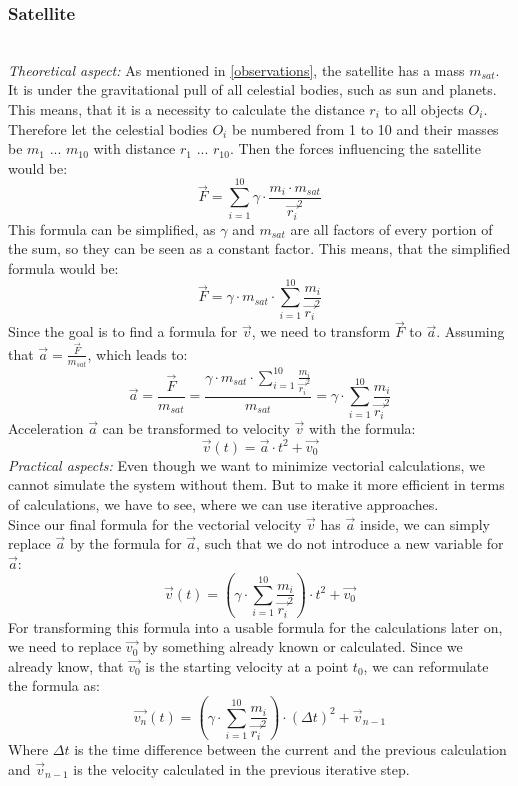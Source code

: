 \documentclass[conference,compsoc]{IEEEtran}
\begin{document}
\subsubsection{Satellite}\hfill\\
\label{satellite}
\emph{Theoretical aspect: } As mentioned in \ref{observations}, the satellite has a mass $m_{sat}$. It is under the gravitational pull of all celestial bodies, such as sun and planets. This means, that it is a necessity to calculate the distance $r_{i}$ to all objects $O_{i}$.
Therefore let the celestial bodies $O_{i}$ be numbered from 1 to 10 and their masses be $m_{1}$ ... $m_{10}$ with distance $r_{1}$ ... $r_{10}$. Then the forces influencing the satellite would be:
$$ \vec{F} = \sum_{i=1}^{10}{\gamma \cdot \frac{m_{i} \cdot m_{sat}}{\vec{r_{i}}^{2}}} $$
This formula can be simplified, as $\gamma$ and $m_{sat}$ are all factors of every portion of the sum, so they can be seen as a constant factor. This means, that the simplified formula would be:
$$ \vec{F} = \gamma \cdot m_{sat} \cdot \sum_{i=1}^{10}{\frac{m_{i}}{\vec{r_{i}}^{2}}} $$
Since the goal is to find a formula for $\vec{v}$, we need to transform $\vec{F}$ to $\vec{a}$. Assuming that $\vec{a} = \frac{\vec{F}}{m_{sat}}$, which leads to:
$$ \vec{a} = \frac{\vec{F}}{m_{sat}} = \frac{\gamma \cdot m_{sat} \cdot \sum_{i=1}^{10}{\frac{m_{i}}{\vec{r_{i}}^{2}}}}{m_{sat}} = \gamma \cdot \sum_{i=1}^{10}{\frac{m_{i}}{\vec{r_{i}}^{2}}} $$
Acceleration $\vec{a}$ can be transformed to velocity $\vec{v}$ with the formula: 
$$ \vec{v}(t) = \vec{a} \cdot t^{2} + \vec{v_{0}} $$
\emph{Practical aspects: } Even though we want to minimize vectorial calculations, we cannot simulate the system without them. But to make it more efficient in terms of calculations, we have to see, where we can use iterative approaches. \\ 
Since our final formula for the vectorial velocity $\vec{v}$ has $\vec{a}$ inside, we can simply replace $\vec{a}$ by the formula for $\vec{a}$, such that we do not introduce a new variable for $\vec{a}$:
$$ \vec{v}(t) = (\gamma \cdot \sum_{i=1}^{10}{\frac{m_{i}}{\vec{r_{i}}^{2}}}) \cdot t^{2} + \vec{v_{0}} $$
For transforming this formula into a usable formula for the calculations later on, we need to replace $\vec{v_{0}}$ by something already known or calculated. Since we already know, that $\vec{v_{0}}$ is the starting velocity at a point $t_{0}$, we can reformulate the formula as:
$$ \vec{v_{n}}(t) = (\gamma \cdot \sum_{i=1}^{10}{\frac{m_{i}}{\vec{r_{i}}^{2}}}) \cdot (\Delta t)^{2} + \vec{v}_{n-1} $$
Where $ \Delta t$ is the time difference between the current and the previous calculation and $\vec{v}_{n-1}$ is the velocity calculated in the previous iterative step.
\end{document}
